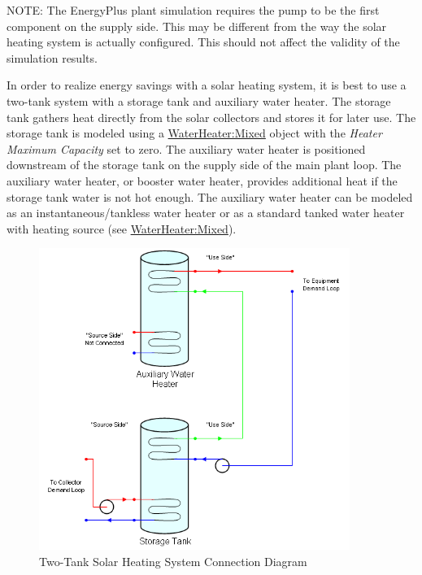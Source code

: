 NOTE: The EnergyPlus plant simulation requires the pump to be the first component on the supply side. This may be different from the way the solar heating system is actually configured. This should not affect the validity of the simulation results.

In order to realize energy savings with a solar heating system, it is best to use a two-tank system with a storage tank and auxiliary water heater. The storage tank gathers heat directly from the solar collectors and stores it for later use. The storage tank is modeled using a \hyperref[waterheatermixed]{WaterHeater:Mixed} object with the \emph{Heater Maximum Capacity} set to zero. The auxiliary water heater is positioned downstream of the storage tank on the supply side of the main plant loop. The auxiliary water heater, or booster water heater, provides additional heat if the storage tank water is not hot enough. The auxiliary water heater can be modeled as an instantaneous/tankless water heater or as a standard tanked water heater with heating source (see \hyperref[waterheatermixed]{WaterHeater:Mixed}).

\begin{figure}[hbtp] %
\centering
\includegraphics[width=0.9\textwidth, height=0.9\textheight, keepaspectratio=true]{media/image340.png}
\caption{Two-Tank Solar Heating System Connection Diagram \protect \label{fig:two-tank-solar-heating-system-connection}}
\end{figure}

